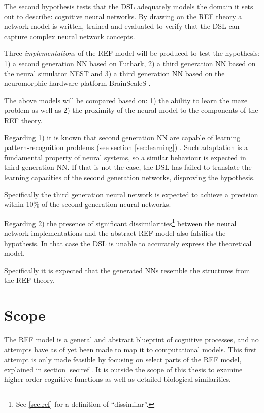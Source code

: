 \documentclass[report.tex]{subfiles}
\begin{document}
The second hypothesis tests that the DSL adequately models the domain it sets
out to describe: cognitive neural networks.
By drawing on the REF theory a network model is written, trained and evaluated to verify
that the DSL can capture complex neural network concepts.

Three \textit{implementation}s of the \gls{REF} model will be
produced to test the hypothesis: 
  1) a second generation \gls{NN} based on Futhark, 
  2) a third generation \gls{NN} based on the neural simulator \gls{NEST} and
  3) a third generation \gls{NN} based on the neuromorphic 
     hardware platform BrainScaleS .

The above models will be compared based on:
1) the ability to learn the maze problem as well as 
2) the proximity of the neural model to the components of the
   \gls{REF} theory.

Regarding 1) it is known that second generation \gls{NN} are
capable of learning pattern-recognition problems (see section \ref{sec:learning})
\cite{Russel2007}.
Such adaptation is a fundamental property of neural systems, so a
similar behaviour is expected in third generation \gls{NN}.
If that is not the case, the \gls{DSL} has failed to translate
the learning capacities of the second generation networks,
disproving the hypothesis.

Specifically the third generation neural network is expected to
achieve a precision within 10\% of the second generation neural 
networks.

Regarding 2) the presence of significant
dissimilarities\footnote{See \ref{sec:ref} for a definition of
\enquote{dissimilar}.} between the neural network implementations 
and the abstract \gls{REF} model also falsifies the hypothesis. 
In that case the \gls{DSL} is unable to accurately express the
theoretical model.

Specifically it is expected that the generated \gls{NN}s resemble
the structures from the \gls{REF} theory.

\section{Scope} \label{sec:scope}
The \gls{REF} model is a general and abstract blueprint of cognitive
processes, and no attempts have as of yet been made to map it to
computational models.
This first attempt is only made feasible by focusing on select parts
of the \gls{REF} model, explained in section \ref{sec:ref}.
It is outside the scope of this thesis to examine
higher-order cognitive functions as well as detailed biological
similarities.
\end{document}
